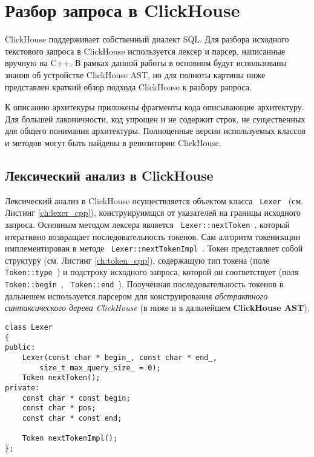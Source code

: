 \section{Разбор запроса в ClickHouse} \label{chap:clickhouse}
ClickHouse поддерживает собственный диалект SQL. Для разбора исходного текстового запроса в ClickHouse используется лексер и парсер, написанные вручную на C++. В рамках данной работы в основном будут использованы знания об устройстве ClickHouse AST, но для полноты картины ниже представлен краткий обзор подхода ClickHouse к разбору рапроса. 

К описанию архитекуры приложены фрагменты кода описывающие архитектуру. Для большей лаконичности, код упрощен и не содержит строк, не существенных для общего понимания архитектуры. Полноценные версии используемых классов и методов могут быть найдены в репозитории ClickHouse.  

\subsection{Лексический анализ в ClickHouse}

Лексический анализ в ClickHouse осуществляется объектом класса \texttt{ Lexer } (см. Листинг \ref{ch:lexer_cpp}), конструируимщся от указателей на границы исходного запроса. Основным методом лексера является \texttt{ Lexer::nextToken }, который итеративно возвращает последовательность токенов. Сам алгоритм токенизации имплементирован в методе \texttt{ Lexer::nextTokenImpl }. Токен представляет собой структуру (см. Листинг \ref{ch:token_cpp}), содержащую тип токена (поле \texttt{ Token::type }) и подстроку исходного запроса, которой он соответствует (поля \texttt{ Token::begin }, \texttt{ Token::end }). Полученная последовательность токенов в дальнешем используется парсером для конструирования \textit{абстрактного синтаксического дерева ClickHouse} (в ниже и в дальнейшем \textbf{ClickHouse AST}).

\begin{code}
    \label{ch:lexer_cpp}
    \begin{verbatim}
class Lexer
{
public:
    Lexer(const char * begin_, const char * end_,
        size_t max_query_size_ = 0);
    Token nextToken();
private:
    const char * const begin;
    const char * pos;
    const char * const end;

    Token nextTokenImpl();
};
    \end{verbatim}
\end{code}

